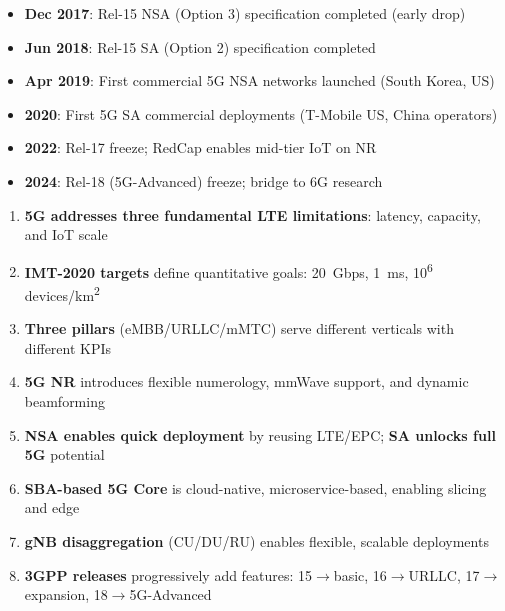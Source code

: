 



\begin{itemize}
\tightlist
\item
  \textbf{Dec 2017}: Rel-15 NSA (Option 3) specification completed (early drop)
\item
  \textbf{Jun 2018}: Rel-15 SA (Option 2) specification completed
\item
  \textbf{Apr 2019}: First commercial 5G NSA networks launched (South Korea, US)
\item
  \textbf{2020}: First 5G SA commercial deployments (T-Mobile US, China operators)
\item
  \textbf{2022}: Rel-17 freeze; RedCap enables mid-tier IoT on NR
\item
  \textbf{2024}: Rel-18 (5G-Advanced) freeze; bridge to 6G research
\end{itemize}


\begin{enumerate}
\def\labelenumi{\arabic{enumi}.}
\tightlist
\item
  \textbf{5G addresses three fundamental LTE limitations}: latency, capacity, and IoT scale
\item
  \textbf{IMT-2020 targets} define quantitative goals: 20~Gbps, 1~ms, 10\textsuperscript{6} devices/\allowbreak{}km\textsuperscript{2}
\item
  \textbf{Three pillars} (eMBB/\allowbreak{}URLLC/\allowbreak{}mMTC) serve different verticals with different KPIs
\item
  \textbf{5G NR} introduces flexible numerology, mmWave support, and dynamic beamforming
\item
  \textbf{NSA enables quick deployment} by reusing LTE/\allowbreak{}EPC; \textbf{SA unlocks full 5G} potential
\item
  \textbf{SBA-based 5G Core} is cloud-native, microservice-based, enabling slicing and edge
\item
  \textbf{gNB disaggregation} (CU/\allowbreak{}DU/\allowbreak{}RU) enables flexible, scalable deployments
\item
  \textbf{3GPP releases} progressively add features: 15\ensuremath{\to}basic, 16\ensuremath{\to}URLLC, 17\ensuremath{\to}expansion, 18\ensuremath{\to}5G-Advanced
\end{enumerate}

